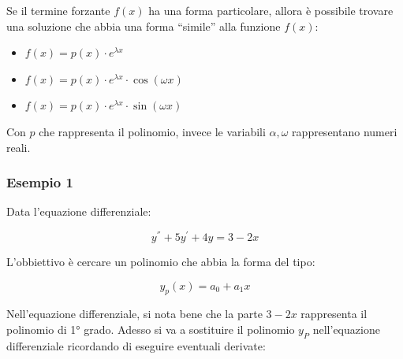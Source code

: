 \documentclass[a4paper]{article}
\newcommand{\dquotes}[1]{``#1''}
\begin{document}
	\noindent
	Se il termine forzante $f\left(x\right)$ ha una forma particolare, allora è possibile trovare una soluzione che abbia una forma \dquotes{simile} alla funzione $f\left(x\right)$:
	
	\begin{itemize}
		\item $f\left(x\right) = p\left(x\right) \cdot e^{\lambda x}$
		
		\item $f\left(x\right) = p\left(x\right) \cdot e^{\lambda x} \cdot \cos\left(\omega x\right)$
		
		\item $f\left(x\right) = p\left(x\right) \cdot e^{\lambda x} \cdot \sin\left(\omega x\right)$
	\end{itemize}

	\noindent
	Con $p$ che rappresenta il polinomio, invece le variabili $\alpha, \omega$ rappresentano numeri reali.
	
	\subsubsection[Esempio 1]{\textcolor{Green4}{Esempio 1}}
	
	Data l'equazione differenziale:
	
	\begin{equation*}
		y^{''} + 5y^{'} + 4y = 3 - 2x
	\end{equation*}
	
	\noindent
	L'obbiettivo è cercare un polinomio che abbia la forma del tipo:
	
	\begin{equation*}
		y_{p}\left(x\right) = a_{0} + a_{1}x
	\end{equation*}

	\noindent
	Nell'equazione differenziale, si nota bene che la parte $3-2x$ rappresenta il polinomio di 1° grado. Adesso si va a sostituire il polinomio $y_{P}$ nell'equazione differenziale ricordando di eseguire eventuali derivate:
	
\end{document}
